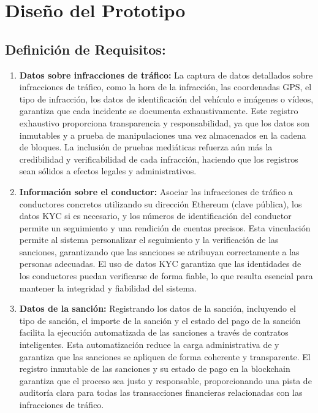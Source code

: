 \section{Diseño del Prototipo }
    \subsection{Definición de Requisitos:  }
    
\begin{enumerate}
    \item \textbf{Datos sobre infracciones de tráfico:} La captura de datos detallados sobre infracciones de tráfico, como la hora de la infracción, las coordenadas GPS, el tipo de infracción, los datos de identificación del vehículo e imágenes o vídeos, garantiza que cada incidente se documenta exhaustivamente. Este registro exhaustivo proporciona transparencia y responsabilidad, ya que los datos son inmutables y a prueba de manipulaciones una vez almacenados en la cadena de bloques. La inclusión de pruebas mediáticas refuerza aún más la credibilidad y verificabilidad de cada infracción, haciendo que los registros sean sólidos a efectos legales y administrativos. 
    \item \textbf{Información sobre el conductor:} Asociar las infracciones de tráfico a conductores concretos utilizando su dirección Ethereum (clave pública), los datos KYC si es necesario, y los números de identificación del conductor permite un seguimiento y una rendición de cuentas precisos. Esta vinculación permite al sistema personalizar el seguimiento y la verificación de las sanciones, garantizando que las sanciones se atribuyan correctamente a las personas adecuadas. El uso de datos KYC garantiza que las identidades de los conductores puedan verificarse de forma fiable, lo que resulta esencial para mantener la integridad y fiabilidad del sistema.
    \item \textbf{Datos de la sanción: }  Registrando los datos de la sanción, incluyendo el tipo de sanción, el importe de la sanción y el estado del pago de la sanción facilita la ejecución automatizada de las sanciones a través de contratos inteligentes. Esta automatización reduce la carga administrativa de y garantiza que las sanciones se apliquen de forma coherente y transparente. El registro inmutable de las sanciones y su estado de pago en la blockchain garantiza que el proceso sea justo y responsable, proporcionando una pista de auditoría clara para todas las transacciones financieras relacionadas con las infracciones de tráfico.

\end{enumerate}
